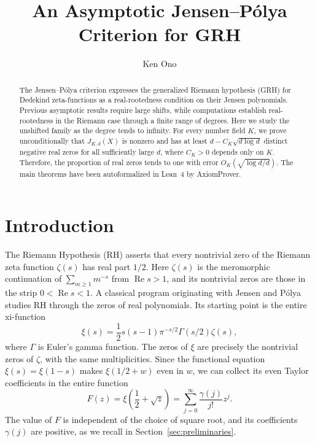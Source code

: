 \documentclass[11pt,reqno]{amsart}
\title[An Asymptotic Jensen--P\'olya Criterion for GRH]{An Asymptotic Jensen--P\'olya Criterion for GRH}
\author{Ken Ono}
\numberwithin{equation}{section}
\renewcommand{\Re}{\operatorname{Re}}
\begin{document}
\begin{abstract}
The Jensen--P\'olya criterion expresses the generalized Riemann
hypothesis (GRH) for Dedekind zeta-functions as a real-rootedness
condition on their Jensen polynomials. Previous asymptotic results
require large shifts, while computations establish real-rootedness
in the Riemann case through a finite range of degrees.
Here we study the unshifted family as the degree tends to infinity.
For every number field $K$, we prove unconditionally that
$J_{K,d}(X)$ is nonzero and has at least
$d-C_K\sqrt{d\log d}$ distinct negative real zeros for all
sufficiently large $d$, where $C_K>0$ depends only on $K$.
Therefore, the proportion of real zeros tends to one with error
$O_K(\sqrt{\log d/d})$. 
The main theorems have been autoformalized in Lean~4 by AxiomProver.
\end{abstract}

\maketitle

\section{Introduction}\label{sec:introduction}

The Riemann Hypothesis (RH) asserts that every nontrivial zero of the
Riemann zeta function $\zeta(s)$ has real part $1/2$. Here $\zeta(s)$
is the meromorphic continuation of $\sum_{m\ge1}m^{-s}$ from
$\Re s>1$, and its nontrivial zeros are those in the strip
$0<\Re s<1$. A classical program originating with Jensen \cite{Jensen} and
P\'olya \cite{Polya} studies RH through the zeros of real
polynomials. Its starting point is the entire xi-function
\begin{equation}\label{eq:xi-definition}
 \xi(s)=\frac12s(s-1)\pi^{-s/2}\Gamma(s/2)\zeta(s),
\end{equation}
where $\Gamma$ is Euler's gamma function. The zeros of $\xi$ are
precisely the nontrivial zeros of $\zeta$, with the same multiplicities.
Since the functional equation $\xi(s)=\xi(1-s)$ makes
$\xi(1/2+w)$ even in $w$, we can collect its even Taylor coefficients
in the entire function
\begin{equation}\label{eq:F-definition}
 F(z)=\xi\!\left(\frac12+\sqrt z\right)
     =\sum_{j=0}^{\infty}\frac{\gamma(j)}{j!}z^j.
\end{equation}
The value of $F$ is independent of the choice of square root, and its
coefficients $\gamma(j)$ are positive, as we recall in
Section~\ref{sec:preliminaries}.
\end{document}
